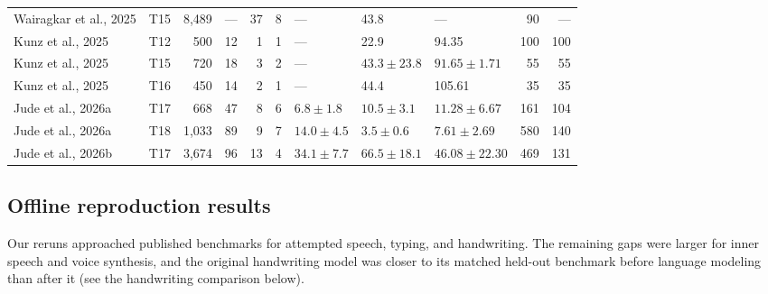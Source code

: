 \documentclass[11pt]{article}
\begin{document}
\begin{table}[t]
\begin{tabular}{@{}>{\raggedright\arraybackslash}p{3.50cm}lrrrrlllrr@{}}
Wairagkar et al., 2025 \cite{wairagkar2025} & T15 & 8{,}489 & --- & 37 & 8 & --- & 43.8 & --- & 90 & --- \\
Kunz et al., 2025 \cite{kunz2025} & T12 & 500 & 12 & 1 & 1 & --- & 22.9 & 94.35 & 100 & 100 \\
Kunz et al., 2025 \cite{kunz2025} & T15 & 720 & 18 & 3 & 2 & --- & $43.3{\pm}23.8$ & $91.65{\pm}1.71$ & 55 & 55 \\
Kunz et al., 2025 \cite{kunz2025} & T16 & 450 & 14 & 2 & 1 & --- & 44.4 & 105.61 & 35 & 35 \\
Jude et al., 2026a \cite{jude2026typing} & T17 & 668 & 47 & 8 & 6 & $6.8{\pm}1.8$ & $10.5{\pm}3.1$ & $11.28{\pm}6.67$ & 161 & 104 \\
Jude et al., 2026a \cite{jude2026typing} & T18 & 1{,}033 & 89 & 9 & 7 & $14.0{\pm}4.5$ & $3.5{\pm}0.6$ & $7.61{\pm}2.69$ & 580 & 140 \\
Jude et al., 2026b \cite{jude2026lis} & T17 & 3{,}674 & 96 & 13 & 4 & $34.1{\pm}7.7$ & $66.5{\pm}18.1$ & $46.08{\pm}22.30$ & 469 & 131 \\
\bottomrule
\end{tabular}
\end{table}

\subsection{Offline reproduction results}

Our reruns approached published benchmarks for attempted speech,
typing, and handwriting. The remaining gaps were larger for inner
speech and voice synthesis, and the original handwriting model was
closer to its matched held-out benchmark before language modeling than
after it (see the handwriting comparison below).
\end{document}
